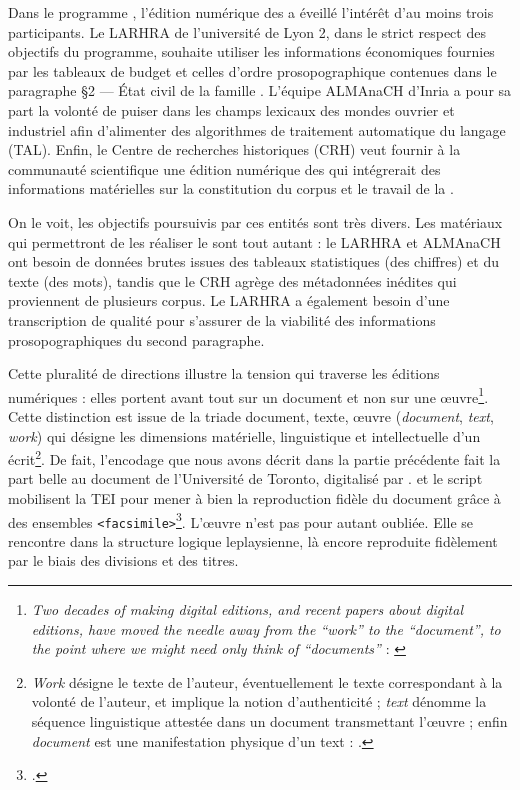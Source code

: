Dans le programme \timeus{}, l'édition numérique des \odm{} a éveillé l'intérêt d'au moins trois participants. Le LARHRA de l'université de Lyon 2, dans le strict respect des objectifs du programme, souhaite utiliser les informations économiques fournies par les tableaux de budget et celles d'ordre prosopographique contenues dans le paragraphe \og §2 --- État civil de la famille \fg. L'équipe ALMAnaCH d'Inria a pour sa part la volonté de puiser dans les champs lexicaux des mondes ouvrier et industriel afin d'alimenter des algorithmes de traitement automatique du langage (TAL). Enfin, le Centre de recherches historiques (CRH) veut fournir à la communauté scientifique une édition numérique des \odm{} qui intégrerait des informations matérielles sur la constitution du corpus et le travail de la \sess.

On le voit, les objectifs poursuivis par ces entités sont très divers. Les matériaux qui permettront de les réaliser le sont tout autant : le LARHRA et ALMAnaCH ont besoin de données brutes issues des tableaux statistiques (des chiffres) et du texte (des mots), tandis que le CRH agrège des métadonnées inédites qui proviennent de plusieurs corpus. Le LARHRA a également besoin d'une transcription de qualité pour s'assurer de la viabilité des informations prosopographiques du second paragraphe.

Cette pluralité de directions illustre la tension qui traverse les éditions numériques : elles portent avant tout sur un document et non sur une \oe{}uvre\footnote{\og \textit{Two decades of making digital editions, and recent papers about digital editions, have moved the needle away from the “work” to the “document”, to the point where we might need only think of “documents”} \fg{} : \cite[p. 107]{robinson}}. Cette distinction est issue de la triade document, texte, \oe{}uvre (\textit{document}, \textit{text}, \textit{work}) qui désigne les dimensions matérielle, linguistique et intellectuelle d'un écrit\footnote{\og \textit{Work} désigne le texte de l’auteur, éventuellement le texte correspondant à la volonté de l’auteur, et implique la notion d’authenticité ; \textit{text} dénomme la séquence linguistique attestée dans un document transmettant l’œuvre ; enfin \textit{document} est une manifestation physique d’un text \fg{} : \cite[p. 15-16]{duval}.}. De fait, l'encodage que nous avons décrit dans la partie précédente fait la part belle au document \odm{} de l'Université de Toronto, digitalisé par \ia. \transkribus{} et le script \lse{} mobilisent la TEI pour mener à bien la reproduction fidèle du document grâce à des ensembles \texttt{<facsimile>}\footcite[p. 124]{robinson}. L'\oe{}uvre n'est pas pour autant oubliée. Elle se rencontre dans la structure logique leplaysienne, là encore reproduite fidèlement par le biais des divisions et des titres.

